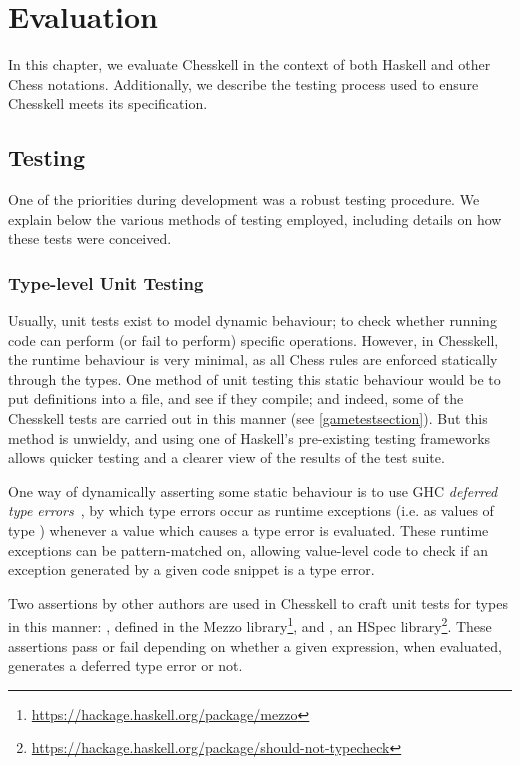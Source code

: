 \chapter{Evaluation}

In this chapter, we evaluate Chesskell in the context of both Haskell and other Chess notations. Additionally, we describe the testing process used to ensure Chesskell meets its specification.

\section{Testing} \label{testsection}

One of the priorities during development was a robust testing procedure. We explain below the various methods of testing employed, including details on how these tests were conceived.

\subsection{Type-level Unit Testing} \label{reflsection}

Usually, unit tests exist to model dynamic behaviour; to check whether running code can perform (or fail to perform) specific operations. However, in Chesskell, the runtime behaviour is very minimal, as all Chess rules are enforced statically through the types. One method of unit testing this static behaviour would be to put definitions into a file, and see if they compile; and indeed, some of the Chesskell tests are carried out in this manner (see \cref{gametestsection}). But this method is unwieldy, and using one of Haskell's pre-existing testing frameworks allows quicker testing and a clearer view of the results of the test suite.

One way of dynamically asserting some static behaviour is to use GHC \emph{deferred type errors}~\cite{deferredtypeerrors}, by which type errors occur as runtime exceptions (i.e. as values of type ) whenever a value which causes a type error is evaluated. These runtime exceptions can be pattern-matched on, allowing value-level code to check if an exception generated by a given code snippet is a type error.

Two assertions by other authors are used in Chesskell to craft unit tests for types in this manner: , defined in the Mezzo library\footnote{\url{https://hackage.haskell.org/package/mezzo}}, and , an HSpec library\footnote{\url{https://hackage.haskell.org/package/should-not-typecheck}}. These assertions pass or fail depending on whether a given expression, when evaluated, generates a deferred type error or not.

